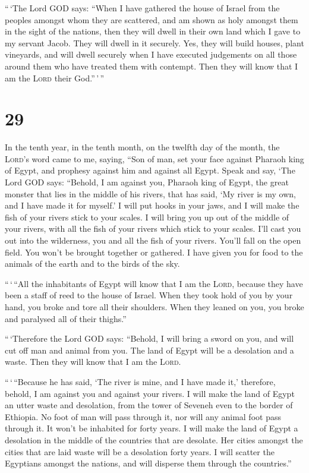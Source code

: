  ``\,`The Lord GOD says: ``When I have gathered the house
of Israel from the peoples amongst whom they are scattered, and am shown
as holy amongst them in the sight of the nations, then they will dwell
in their own land which I gave to my servant Jacob.  They
will dwell in it securely. Yes, they will build houses, plant vineyards,
and will dwell securely when I have executed judgements on all those
around them who have treated them with contempt. Then they will know
that I am the \textsc{Lord} their God.''\,'\,''

\hypertarget{section-28}{%
\section{29}\label{section-28}}

 In the tenth year, in the tenth month, on the twelfth day
of the month, the \textsc{Lord}'s word came to me, saying,
 ``Son of man, set your face against Pharaoh king of
Egypt, and prophesy against him and against all Egypt. 
Speak and say, `The Lord GOD says: ``Behold, I am against you, Pharaoh
king of Egypt, the great monster that lies in the middle of his rivers,
that has said, `My river is my own, and I have made it for myself.'
 I will put hooks in your jaws, and I will make the fish
of your rivers stick to your scales. I will bring you up out of the
middle of your rivers, with all the fish of your rivers which stick to
your scales.  I'll cast you out into the wilderness, you
and all the fish of your rivers. You'll fall on the open field. You
won't be brought together or gathered. I have given you for food to the
animals of the earth and to the birds of the sky.

 ``\,`\,``All the inhabitants of Egypt will know that I am
the \textsc{Lord}, because they have been a staff of reed to the house
of Israel.  When they took hold of you by your hand, you
broke and tore all their shoulders. When they leaned on you, you broke
and paralysed all of their thighs.''

 ``\,`Therefore the Lord GOD says: ``Behold, I will bring
a sword on you, and will cut off man and animal from you. 
The land of Egypt will be a desolation and a waste. Then they will know
that I am the \textsc{Lord}.

``\,`\,``Because he has said, `The river is mine, and I have made it,'
 therefore, behold, I am against you and against your
rivers. I will make the land of Egypt an utter waste and desolation,
from the tower of Seveneh even to the border of Ethiopia.
 No foot of man will pass through it, nor will any animal
foot pass through it. It won't be inhabited for forty years.
 I will make the land of Egypt a desolation in the middle
of the countries that are desolate. Her cities amongst the cities that
are laid waste will be a desolation forty years. I will scatter the
Egyptians amongst the nations, and will disperse them through the
countries.''

